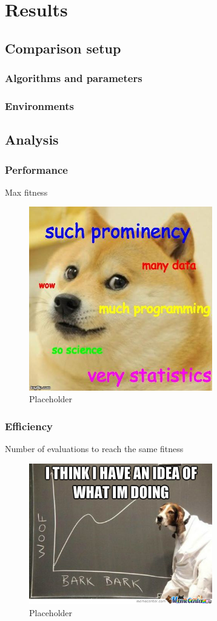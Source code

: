 \chapter{Results}
\label{sec:results}

\section{Comparison setup}
\subsection{Algorithms and parameters}

\subsection{Environments}

\section{Analysis}

\subsection{Performance}
Max fitness
\begin{figure}[H]
\centering
\includegraphics[width=8cm]{images/data_meme.jpg}
\caption{Placeholder}
\end{figure}
      
      
\subsection{Efficiency}
Number of evaluations to reach the same fitness
\begin{figure}[H]
\centering
\includegraphics[width=8cm]{images/data_meme2.jpg}
\caption{Placeholder}
\end{figure}

